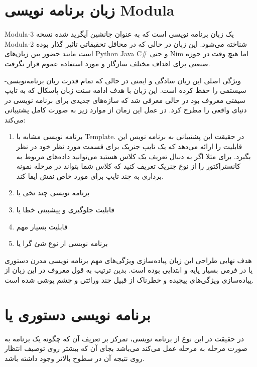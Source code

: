 \documentclass[20pt, a4paper]{article}
\begin{document}
\section{زبان برنامه نویسی Modula}

Modula-3 یک زبان برنامه نویسی است که به عنوان جانشین آپگرید شده نسخه
Modula-2 شناخته می‌شود. این زبان در حالی که در محافل تحقیقاتی تاثیر گذار بوده
است مانند حضور بین زبان‌های Python Java C\# و حتی Nim اما هیچ وقت در حوزه صنعتی
برای اهداف مختلف سازگار و مورد استفاده عموم قرار نگرفت.

ویژگی اصلی این زبان سادگی و ایمنی در حالی که تمام قدرت زبان برنامه‌نویسی-سیستمی
را حفظ کرده است. این زبان با هدف ادامه سنت زبان پاسکال که به تایپ سیفتی معروف
بود در حالی معرفی شد که سازه‌های جدیدی برای برنامه نویسی در دنیای واقعی را مطرح
کرد. در عمل این زمان از موارد زیر به صورت کامل پشتیبانی می‌کند:

\begin{enumerate}
    \item برنامه نویسی  مشابه با Template. در حقیقت این پشتیبانی به
    برنامه نویس این قابلیت را ارائه می‌دهد که یک تایپ جنریک برای قسمت مورد نظر
    خود در نظر بگیرد. برای مثلا اگر به دنبال تعریف یک کلاس هستید می‌توانید
    داده‌های مربوط به کانستراکتور را از نوع جنریک تعریف کنید که کلاس شما بتواند
    در مرحله نمونه برداری به چند تایپ برای مورد خاص نقش ایفا کند.
    \item برنامه نویسی چند نخی یا 
    \item قابلیت جلوگیری و پیشبینی خطا یا 
    \item قابلیت بسیار مهم 
    \item برنامه نویسی از نوع شئ گرا یا 
\end{enumerate}

هدف نهایی طراحی این زبان پیاده‌سازی ویژگی‌های مهم برنامه نویسی مدرن دستوری یا
در فرمی بسیار پایه و ابتدایی بوده است.  بدین ترتیب به قول معروف در این زبان از
پیاده‌سازی ویژگی‌های پیچیده و خطرناک از قبیل چند وراثتی و  چشم پوشی شده است.

\section{برنامه نویسی دستوری یا }

در حقیقت در این نوع از برنامه نویسی، تمرکز بر تعریف آن که چگونه یک برنامه به
صورت مرحله به مرحله عمل می‌کند می‌باشد بجای آن که بیشتر روی توصیف انتظار روی
نتیجه آن در سطوح بالاتر وجود داشته باشد.
\end{document}
